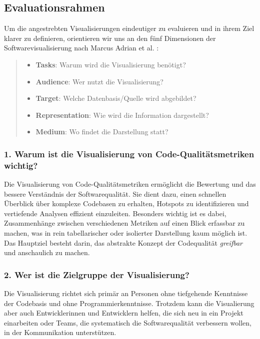 \subsection{Evaluationsrahmen} \label{sec:Evaluationsrahmen}

Um die angestrebten Visualisierungen eindeutiger zu evaluieren und in ihrem Ziel klarer zu definieren, orientieren wir uns an den fünf Dimensionen der Softwarevisualisierung nach Marcus Adrian et al. \cite[2]{3dsoftwareMarcus}:
\begin{quote}
    \begin{itemize}
        \item \textbf{Tasks}: Warum wird die Visualisierung benötigt?
        \item \textbf{Audience}: Wer nutzt die Visualisierung?
        \item \textbf{Target}: Welche Datenbasis/Quelle wird abgebildet?
        \item \textbf{Representation}: Wie wird die Information dargestellt?
        \item \textbf{Medium}: Wo findet die Darstellung statt?
    \end{itemize}
\end{quote}

\subsubsection*{1. Warum ist die Visualisierung von Code-Qualitätsmetriken wichtig?}
Die Visualisierung von Code-Qualitätsmetriken ermöglicht die Bewertung und das bessere Verständnis der Softwarequalität. Sie dient dazu, einen schnellen Überblick über komplexe Codebasen zu erhalten, Hotspots zu identifizieren und vertiefende Analysen effizient einzuleiten. Besonders wichtig ist es dabei, Zusammenhänge zwischen verschiedenen Metriken auf einen Blick erfassbar zu machen, was in rein tabellarischer oder isolierter Darstellung kaum möglich ist. Das Hauptziel besteht darin, das abstrakte Konzept der Codequalität \textit{greifbar} und anschaulich zu machen.

\subsubsection*{2. Wer ist die Zielgruppe der Visualisierung?}
Die Visualisierung richtet sich primär an Personen ohne tiefgehende Kenntnisse der Codebasis und ohne Programmierkenntnisse. Trotzdem kann die Visualierung aber auch Entwicklerinnen und Entwicklern helfen, die sich neu in ein Projekt einarbeiten oder Teams, die systematisch die Softwarequalität verbessern wollen, in der Kommunikation unterstützen.

